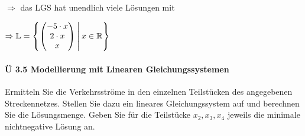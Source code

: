 \documentclass{scrreprt}
\begin{document}
\begin{enumerate}[(i)]
  $\Rightarrow$ das LGS hat unendlich viele Lösungen mit
  \begin{small}
    $\Rightarrow \mathbb{L} = \qty{\begin{pmatrix}-5 \cdot x \\ 2 \cdot x \\ x \end{pmatrix}
    \:\middle|\: x \in \mathbb{R}}$
  \end{small}
\end{enumerate}

\newpage
\paragraph{Ü 3.5 Modellierung mit Linearen Gleichungssystemen}
Ermitteln Sie die Verkehrsströme in den einzelnen Teilstücken des angegebenen
Streckennetzes.
Stellen Sie dazu ein lineares Gleichungssystem auf und berechnen Sie die
Lösungsmenge.
Geben Sie für die Teilstücke $x_2, x_3, x_4$ jeweils die minimale nichtnegative
Lösung an.
\end{document}
